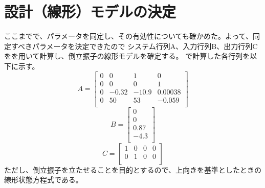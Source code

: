 \section{設計（線形）モデルの決定}
	ここまでで、パラメータを同定し、その有効性についても確かめた。よって、同定すべきパラメータを決定できたので
	システム行列A、入力行列B、出力行列Cを\MaTX{}を用いて計算し、倒立振子の線形モデルを確定する。
	\MaTX{}で計算した各行列を以下に示す。
	\begin{equation}
		A=\left[
		\begin{array}{cccc}
			0 & 0 & 1 & 0 \\
			0 & 0 & 0 & 1 \\
			0 & -0.32 & -10.9 & 0.00038 \\
			0 & 50 & 53 & -0.059 \\
		\end{array}
		\right]
	\end{equation}
	\begin{equation}
		B=\left[
		\begin{array}{c}
			0 \\
			0 \\
			0.87 \\
			-4.3 \\
		\end{array}
		\right]
	\end{equation}
	\begin{equation}
		C=\left[
		\begin{array}{cccc}
			1 & 0 & 0 & 0 \\
			0 & 1 & 0 & 0 \\
		\end{array}
		\right]
	\end{equation}
	ただし、倒立振子を立たせることを目的とするので、上向きを基準としたときの線形状態方程式である。
